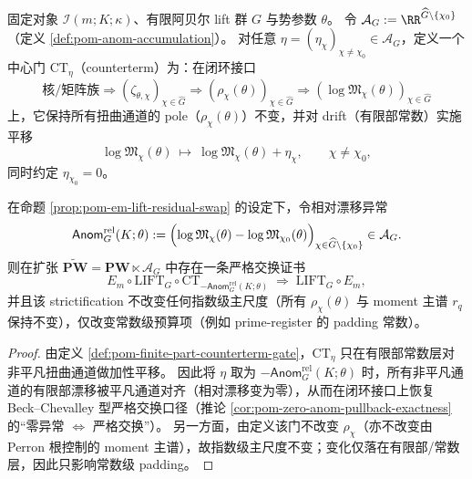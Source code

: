 \begin{definition}\label{def:pom-finite-part-counterterm-gate}
固定对象 \(\mathcal{I}(m;K;\kappa)\)、有限阿贝尔 lift 群 \(G\) 与势参数 \(\theta\)。
令 \(\mathcal{A}_G:=\RR^{\widehat G\setminus\{\chi_0\}}\)（定义 \ref{def:pom-anom-accumulation}）。
对任意 \(\eta=(\eta_\chi)_{\chi\neq\chi_0}\in\mathcal{A}_G\)，定义一个中心门 \(\mathrm{CT}_\eta\)（counterterm）为：在闭环接口
\[
\text{核/矩阵族}\Rightarrow (\zeta_{\theta,\chi})_{\chi\in\widehat G}\Rightarrow (\rho_\chi(\theta))_{\chi\in\widehat G}\Rightarrow (\log\mathfrak{M}_\chi(\theta))_{\chi\in\widehat G}
\]
上，它保持所有扭曲通道的 pole（\(\rho_\chi(\theta)\)）不变，并对 drift（有限部常数）实施平移
\[
\log\mathfrak{M}_\chi(\theta)\ \mapsto\ \log\mathfrak{M}_\chi(\theta)+\eta_\chi,\qquad \chi\neq\chi_0,
\]
同时约定 \(\eta_{\chi_0}=0\)。
\end{definition}

\begin{proposition}\label{prop:pom-counterterm-anom-cancel}
在命题 \ref{prop:pom-em-lift-residual-swap} 的设定下，令相对漂移异常
\[
\mathsf{Anom}^{\mathrm{rel}}_{G}(K;\theta)
:=\Bigl(\log\mathfrak{M}_\chi(\theta)-\log\mathfrak{M}_{\chi_0}(\theta)\Bigr)_{\chi\in\widehat G\setminus\{\chi_0\}}\in\mathcal{A}_G.
\]
则在扩张 \(\widetilde{\mathbf{PW}}=\mathbf{PW}\ltimes\mathcal{A}_G\) 中存在一条严格交换证书
\[
E_m\circ \mathrm{LIFT}_G\circ \mathrm{CT}_{-\mathsf{Anom}^{\mathrm{rel}}_{G}(K;\theta)}
\;\Rightarrow\;
\mathrm{LIFT}_G\circ E_m,
\]
并且该 strictification 不改变任何指数级主尺度（所有 \(\rho_\chi(\theta)\) 与 moment 主谱 \(r_q\) 保持不变），仅改变常数级预算项（例如 prime-register 的 padding 常数）。
\end{proposition}

\begin{proof}
由定义 \ref{def:pom-finite-part-counterterm-gate}，\(\mathrm{CT}_\eta\) 只在有限部常数层对非平凡扭曲通道做加性平移。
因此将 \(\eta\) 取为 \(-\mathsf{Anom}^{\mathrm{rel}}_{G}(K;\theta)\) 时，所有非平凡通道的有限部漂移被平凡通道对齐（相对漂移变为零），从而在闭环接口上恢复 Beck--Chevalley 型严格交换口径（推论 \ref{cor:pom-zero-anom-pullback-exactness} 的“零异常 \(\Leftrightarrow\) 严格交换”）。
另一方面，由定义该门不改变 \(\rho_\chi\)（亦不改变由 Perron 根控制的 moment 主谱），故指数级主尺度不变；变化仅落在有限部/常数层，因此只影响常数级 padding。
\end{proof}

